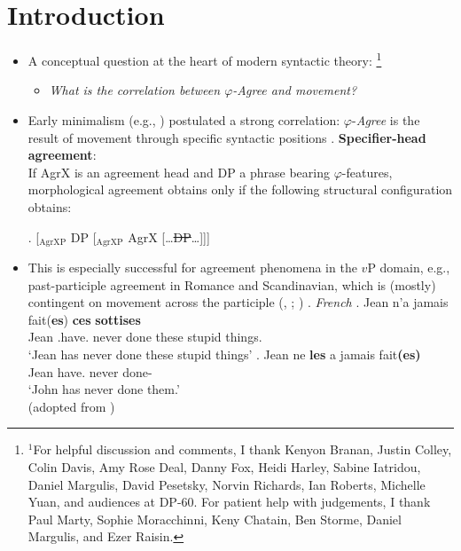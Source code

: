 \documentclass[letterpaper,10pt]{handout_nick}
\newcommand\blfootnote[1]{%
  \begingroup
  \renewcommand\thefootnote{}\footnote{#1}%
  \endgroup
}
\begin{document}
\section{Introduction}
\begin{itemize}
\item A conceptual question at the heart of modern syntactic theory:\blfootnote{$^1$For helpful discussion and comments, I thank Kenyon Branan, Justin Colley, Colin Davis, Amy Rose Deal, Danny Fox, Heidi Harley, Sabine Iatridou, Daniel Margulis, David Pesetsky, Norvin Richards, Ian Roberts, Michelle Yuan, and audiences at DP-60. For patient help with judgements, I thank Paul Marty, Sophie Moracchinni, Keny Chatain, Ben Storme, Daniel Margulis, and Ezer Raisin.}
\begin{itemize}
\item \emph{What is the correlation between $\varphi$-\emph{Agree} and movement?}
\end{itemize}
\item Early minimalism (e.g., \citealt{chomsky95}) postulated a strong correlation: $\varphi$-\emph{Agree} is the result of movement through specific syntactic positions 
\ex. {\bf Specifier-head agreement}:\\
If AgrX is an agreement head and DP a phrase bearing $\varphi$-features, morphological agreement obtains only if the following structural configuration obtains: 

\ex. [$_\text{AgrXP}$ DP [$_\text{AgrXP}$ AgrX [\ldots \st{DP}\ldots]]]

\item This is especially successful for agreement phenomena in the $v$P domain, e.g., past-participle agreement in Romance and Scandinavian, which is (mostly) contingent on movement across the participle (\citealt{kayne85}, \citeyear{kayne89b}; \citealt{christensen89})
\ex.\label{ftppa} \emph{French}
\ag. Jean n'a jamais fait({\bf *es}) {\bf ces} {\bf sottises}\\
Jean .have. never done these {stupid things}.\\
`Jean has never done these stupid things'
\bg. Jean ne {\bf les} a jamais fait{\bf (es)}\\
Jean   have. never done-\\
`John has never done them.'\\
(adopted from \citealt{belletti06})


\end{itemize}
\end{document}
